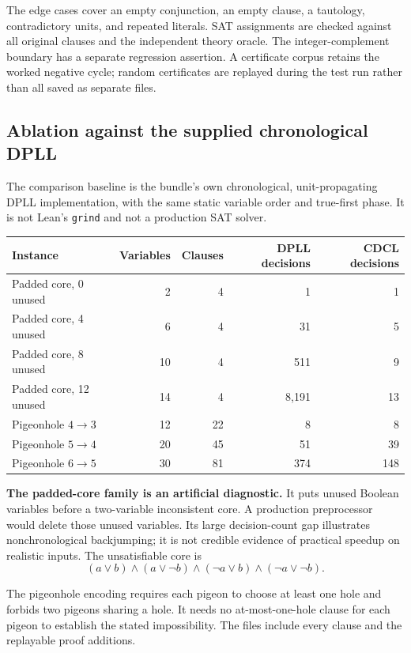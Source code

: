 \documentclass[11pt,letterpaper]{article}
\newcommand{\grind}{\texttt{grind}}
\theoremstyle{definition}\newtheorem{definition}[proposition]{Definition}
\begin{document}
The edge cases cover an empty conjunction, an empty clause, a tautology, contradictory units, and repeated literals. SAT assignments are checked against all original clauses and the independent theory oracle. The integer-complement boundary has a separate regression assertion. A certificate corpus retains the worked negative cycle; random certificates are replayed during the test run rather than all saved as separate files.

\subsection{Ablation against the supplied chronological DPLL}
The comparison baseline is the bundle's own chronological, unit-propagating DPLL implementation, with the same static variable order and true-first phase. It is not Lean's \grind{} and not a production SAT solver.

\begin{center}\small
\begin{tabular}{@{}lrrrr@{}}
\toprule
Instance & Variables & Clauses & DPLL decisions & CDCL decisions \\
\midrule
Padded core, 0 unused & 2 & 4 & 1 & 1 \\
Padded core, 4 unused & 6 & 4 & 31 & 5 \\
Padded core, 8 unused & 10 & 4 & 511 & 9 \\
Padded core, 12 unused & 14 & 4 & 8,191 & 13 \\
Pigeonhole $4\to3$ & 12 & 22 & 8 & 8 \\
Pigeonhole $5\to4$ & 20 & 45 & 51 & 39 \\
Pigeonhole $6\to5$ & 30 & 81 & 374 & 148 \\
\bottomrule
\end{tabular}
\end{center}

\textbf{The padded-core family is an artificial diagnostic.} It puts unused Boolean variables before a two-variable inconsistent core. A production preprocessor would delete those unused variables. Its large decision-count gap illustrates nonchronological backjumping; it is not credible evidence of practical speedup on realistic inputs. The unsatisfiable core is
\[
(a\lor b)\land(a\lor\neg b)\land(\neg a\lor b)\land(\neg a\lor\neg b).
\]

The pigeonhole encoding requires each pigeon to choose at least one hole and forbids two pigeons sharing a hole. It needs no at-most-one-hole clause for each pigeon to establish the stated impossibility. The files include every clause and the replayable proof additions.
\end{document}
